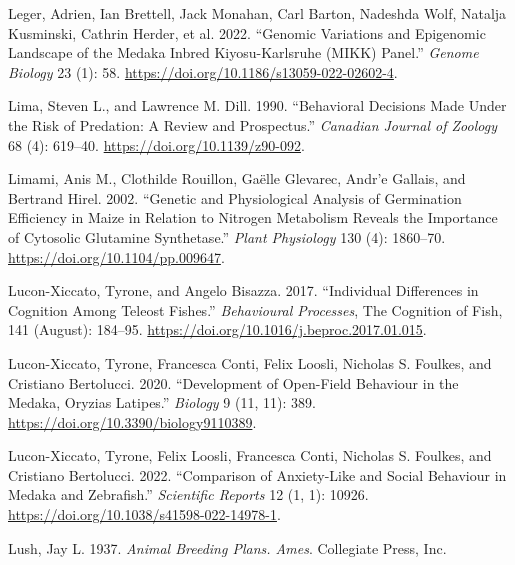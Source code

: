 \documentclass[
]{book}
\newlength{\cslhangindent}
\newlength{\cslentryspacingunit} %
\newenvironment{CSLReferences}[2] %
 {%
  \setlength{\parindent}{0pt}
  \ifodd #1
  \let\oldpar\par
  \def\par{\hangindent=\cslhangindent\oldpar}
  \fi
  \setlength{\parskip}{#2\cslentryspacingunit}
 }%
 {}
\begin{document}
\begin{CSLReferences}{1}{0}
\leavevmode{}%
Leger, Adrien, Ian Brettell, Jack Monahan, Carl Barton, Nadeshda Wolf, Natalja Kusminski, Cathrin Herder, et al. 2022. {``Genomic Variations and Epigenomic Landscape of the {Medaka Inbred Kiyosu-Karlsruhe} ({MIKK}) Panel.''} \emph{Genome Biology} 23 (1): 58. \url{https://doi.org/10.1186/s13059-022-02602-4}.

\leavevmode{}%
Lima, Steven L., and Lawrence M. Dill. 1990. {``Behavioral Decisions Made Under the Risk of Predation: A Review and Prospectus.''} \emph{Canadian Journal of Zoology} 68 (4): 619--40. \url{https://doi.org/10.1139/z90-092}.

\leavevmode{}%
Limami, Anis M., Clothilde Rouillon, Gaëlle Glevarec, Andr'e Gallais, and Bertrand Hirel. 2002. {``Genetic and {Physiological Analysis} of {Germination Efficiency} in {Maize} in {Relation} to {Nitrogen Metabolism Reveals} the {Importance} of {Cytosolic Glutamine Synthetase}.''} \emph{Plant Physiology} 130 (4): 1860--70. \url{https://doi.org/10.1104/pp.009647}.

\leavevmode{}%
Lucon-Xiccato, Tyrone, and Angelo Bisazza. 2017. {``Individual Differences in Cognition Among Teleost Fishes.''} \emph{Behavioural Processes}, The {Cognition} of {Fish}, 141 (August): 184--95. \url{https://doi.org/10.1016/j.beproc.2017.01.015}.

\leavevmode{}%
Lucon-Xiccato, Tyrone, Francesca Conti, Felix Loosli, Nicholas S. Foulkes, and Cristiano Bertolucci. 2020. {``Development of {Open-Field Behaviour} in the {Medaka}, {Oryzias} Latipes.''} \emph{Biology} 9 (11, 11): 389. \url{https://doi.org/10.3390/biology9110389}.

\leavevmode{}%
Lucon-Xiccato, Tyrone, Felix Loosli, Francesca Conti, Nicholas S. Foulkes, and Cristiano Bertolucci. 2022. {``Comparison of Anxiety-Like and Social Behaviour in Medaka and Zebrafish.''} \emph{Scientific Reports} 12 (1, 1): 10926. \url{https://doi.org/10.1038/s41598-022-14978-1}.

\leavevmode{}%
Lush, Jay L. 1937. \emph{Animal Breeding Plans. {Ames}}. {Collegiate Press, Inc}.


\end{CSLReferences}
\end{document}
